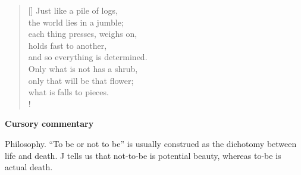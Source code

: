 \documentclass[a4paper,12pt,twoside,final]{book}
\begin{document}
\newpage


\settowidth{\versewidth}{each thing constricts, presses against,}

\begin{verse}[\versewidth]
  Just like a pile of logs, \\
  the world lies in a jumble; \\
  each thing presses, weighs on, \\
  holds fast to another, \\
  and so everything is determined. \\
  Only what is not has a shrub, \\
  only that will be that flower; \\
  what is falls to pieces. \\!
\end{verse}


\bigskip

\noindent \textbf{Cursory commentary}

\medskip

Philosophy. ``To be or not to be'' is usually construed as the
dichotomy between life and death. J tells us that not-to-be is
potential beauty, whereas to-be is actual death.

\newpage

\settowidth{\versewidth}{Csak ami nincs, annak van bokra,}
\end{document}
